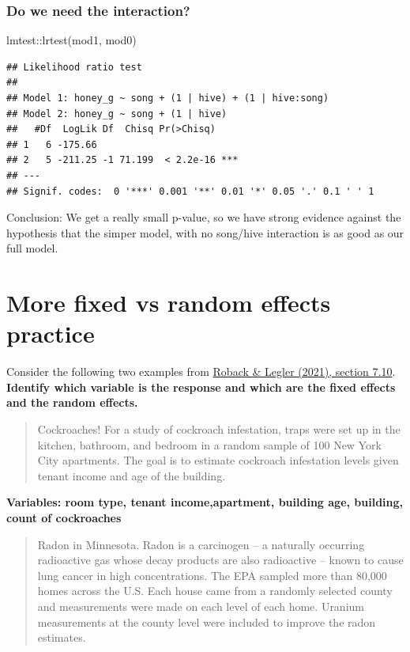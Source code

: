 \documentclass[
  openany]{book}
\newenvironment{Shaded}{\begin{snugshade}}{\end{snugshade}}
\newcommand{\FunctionTok}[1]{\textcolor[rgb]{0.00,0.00,0.00}{#1}}
\newcommand{\NormalTok}[1]{#1}
\newcommand{\SpecialCharTok}[1]{\textcolor[rgb]{0.00,0.00,0.00}{#1}}
\begin{document}
\hypertarget{do-we-need-the-interaction}{%
\subsubsection{Do we need the interaction?}\label{do-we-need-the-interaction}}

\begin{Shaded}
\begin{Highlighting}[]
\NormalTok{lmtest}\SpecialCharTok{::}\FunctionTok{lrtest}\NormalTok{(mod1, mod0)}
\end{Highlighting}
\end{Shaded}

\begin{verbatim}
## Likelihood ratio test
## 
## Model 1: honey_g ~ song + (1 | hive) + (1 | hive:song)
## Model 2: honey_g ~ song + (1 | hive)
##   #Df  LogLik Df  Chisq Pr(>Chisq)    
## 1   6 -175.66                         
## 2   5 -211.25 -1 71.199  < 2.2e-16 ***
## ---
## Signif. codes:  0 '***' 0.001 '**' 0.01 '*' 0.05 '.' 0.1 ' ' 1
\end{verbatim}

Conclusion: We get a really small p-value, so we have strong evidence against the hypothesis that the simper model, with no song/hive interaction is as good as our full model.

\hypertarget{more-fixed-vs-random-effects-practice}{%
\section{More fixed vs random effects practice}\label{more-fixed-vs-random-effects-practice}}

Consider the following two examples from \href{https://bookdown.org/roback/bookdown-BeyondMLR/ch-corrdata.html\#exercises-6}{Roback \& Legler (2021), section 7.10}.
\textbf{Identify which variable is the response and which are the fixed effects and the random effects.}

\begin{quote}
Cockroaches! For a study of cockroach infestation, traps were set up in the kitchen, bathroom, and bedroom in a random sample of 100 New York City apartments. The goal is to estimate cockroach infestation levels given tenant income and age of the building.
\end{quote}

\textbf{Variables: room type, tenant income,apartment, building age, building, count of cockroaches}

\begin{quote}
Radon in Minnesota. Radon is a carcinogen -- a naturally occurring radioactive gas whose decay products are also radioactive -- known to cause lung cancer in high concentrations. The EPA sampled more than 80,000 homes across the U.S. Each house came from a randomly selected county and measurements were made on each level of each home. Uranium measurements at the county level were included to improve the radon estimates.
\end{quote}
\end{document}
